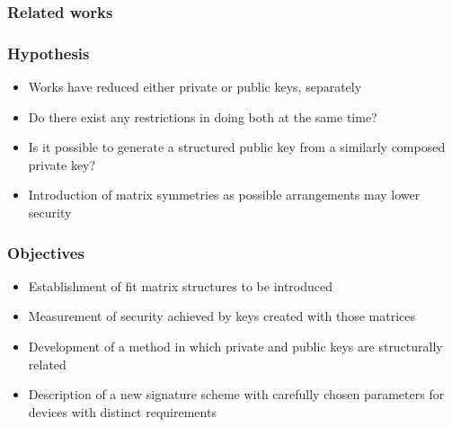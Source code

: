\documentclass[12pt]{beamer}
\begin{document}
\begin{frame}
  \frametitle{Related works}
  \begin{figure}[htbp]
    \tiny
    \startchronology[startyear=2010,stopyear=2018,startdate=false,
      stopdate=false,arrow=false,height=3pt]
    \stopchronology
  \end{figure}
\end{frame}

\begin{frame}
  \frametitle{Hypothesis}
  \begin{itemize}
    \item Works have reduced either private or public keys, separately
    \item Do there exist any restrictions in doing both at the same time?
    \item Is it possible to generate a structured public key from a similarly
        composed private key?
    \item Introduction of matrix symmetries as possible arrangements may lower
        security
  \end{itemize}
\end{frame}

\begin{frame}
  \frametitle{Objectives}
  \begin{itemize}
    \item Establishment of fit matrix structures to be introduced
    \item Measurement of security achieved by keys created with those matrices
    \item Development of a method in which private and public keys are
        structurally related
    \item Description of a new signature scheme with carefully chosen
        parameters for devices with distinct requirements
  \end{itemize}
\end{frame}
\end{document}
